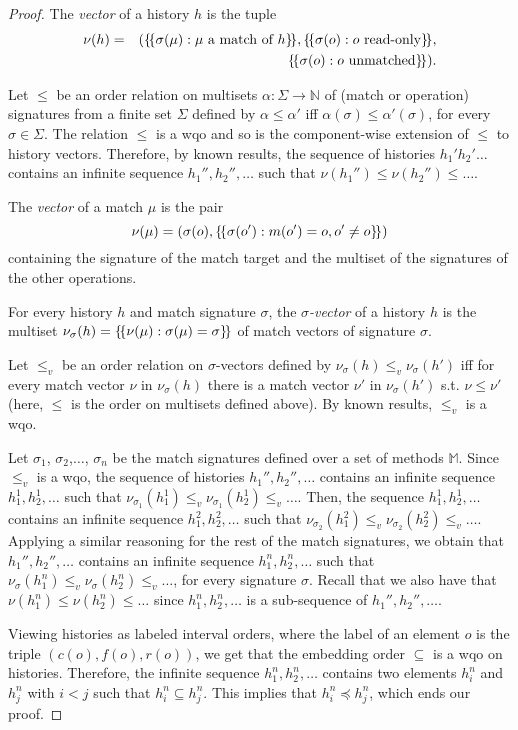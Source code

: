 \begin{proof}
%

The \emph{vector} of a history $h$ is the tuple
\begin{align*}
\nu(h)&=&({\{\!\{ \sigma(\mu): \mu\mbox{ a match of $h$} \}\!\}}, {\{\!\{ \sigma(o): o\mbox{ read-only} \}\!\}}, \\
&& {\{\!\{ \sigma(o): o\mbox{ unmatched} \}\!\}}).
\end{align*}

Let $\leq$ be an order relation on multisets $\alpha:\Sigma\rightarrow\mathbb{N}$ of (match or operation) signatures from a finite set $\Sigma$
defined by $\alpha\leq\alpha'$ iff $\alpha(\sigma)\leq\alpha'(\sigma)$, for every $\sigma\in\Sigma$.
The relation $\leq$ is a wqo and so is the component-wise extension of $\leq$ to history vectors.
Therefore, by known results, the sequence of histories $h_1' h_2' \ldots$ contains
an infinite sequence $h_1'',h_2'',\ldots$ such that $\nu(h_1'')\leq \nu(h_2'')\leq \ldots$.

The \emph{vector} of a match $\mu$ is the pair
\[
\nu(\mu)=(\sigma(o),{\{\!\{ \sigma(o') : m(o')=o, o'\neq o \}\!\}})
\]
containing the signature of the match target and the multiset of the signatures of the other operations.

For every history $h$ and match signature $\sigma$, the \emph{$\sigma$-vector} of a history $h$ is the multiset
$
\nu_\sigma(h)={\{\!\{ \nu(\mu): \sigma(\mu)=\sigma \}\!\}}
$
of match vectors of signature $\sigma$.

Let $\leq_v$ be an order relation on $\sigma$-vectors defined by $\nu_\sigma(h)\leq_v \nu_\sigma(h')$ iff
for every match vector $\nu$ in $\nu_\sigma(h)$ there is a match vector $\nu'$ in $\nu_\sigma(h')$
	s.t. $\nu\leq \nu'$ (here, $\leq$ is the order on multisets defined above).
By known results, $\leq_v$ is a wqo.

Let $\sigma_1$, $\sigma_2$,$\ldots$, $\sigma_n$ be the match signatures defined over a set of methods $\mathbb{M}$.
Since $\leq_v$ is a wqo, the sequence of histories $h_1'',h_2'',\ldots$ contains an
infinite sequence $h_{1}^1,h_{2}^1,\ldots$ such that
$\nu_{\sigma_1}(h_{1}^1)\leq_v \nu_{\sigma_1}(h_{2}^1)\leq_v \ldots$.
Then, the sequence $h_{1}^1,h_{2}^1,\ldots$ contains
an infinite sequence $h_{1}^2,h_{2}^2,\ldots$ such that
$\nu_{\sigma_2}(h_{1}^2)\leq_v \nu_{\sigma_2}(h_{2}^2)\leq_v \ldots$.
Applying a similar reasoning for the rest of the match signatures,
we obtain that $h_1'',h_2'',\ldots$ contains an
infinite sequence $h_{1}^n,h_{2}^n,\ldots$
such that
$\nu_{\sigma}(h_{1}^n)\leq_v \nu_{\sigma}(h_{2}^n)\leq_v \ldots$, for every signature $\sigma$.
Recall that we also have that
$\nu(h_1^n)\leq\nu(h_2^n)\leq\ldots$ since $h_{1}^n,h_{2}^n,\ldots$ is a sub-sequence of $h_1'',h_2'',\ldots$.

Viewing histories as labeled interval orders, where the label of an element $o$ is the triple $(c(o),f(o),r(o))$,
we get that the embedding order $\subseteq$ is a wqo on histories. Therefore, the infinite sequence
$h_{1}^n,h_{2}^n,\ldots$  contains two elements $h_{i}^n$ and $h_j^n$ with $i<j$ such that $h_{i}^n\subseteq h_j^n$.
This implies that $h_i^n\preceq h_j^n$, which ends our proof.
\end{proof}

